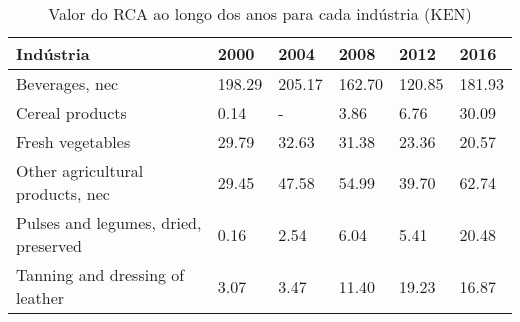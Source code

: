 \begin{table}
\centering
\caption{Valor do RCA ao longo dos anos para cada indústria (KEN)}
\label{tab:ex3-tempo-KEN}
\begin{tabular}{p{6cm}p{1.5cm}p{1.5cm}p{1.5cm}p{1.5cm}p{1.5cm}}
\toprule
                           Indústria &   2000 &   2004 &   2008 &   2012 &   2016 \\
\midrule
                      Beverages, nec & 198.29 & 205.17 & 162.70 & 120.85 & 181.93 \\
                     Cereal products &   0.14 &      - &   3.86 &   6.76 &  30.09 \\
                    Fresh vegetables &  29.79 &  32.63 &  31.38 &  23.36 &  20.57 \\
    Other agricultural products, nec &  29.45 &  47.58 &  54.99 &  39.70 &  62.74 \\
Pulses and legumes, dried, preserved &   0.16 &   2.54 &   6.04 &   5.41 &  20.48 \\
     Tanning and dressing of leather &   3.07 &   3.47 &  11.40 &  19.23 &  16.87 \\
\bottomrule
\end{tabular}
\end{table}

